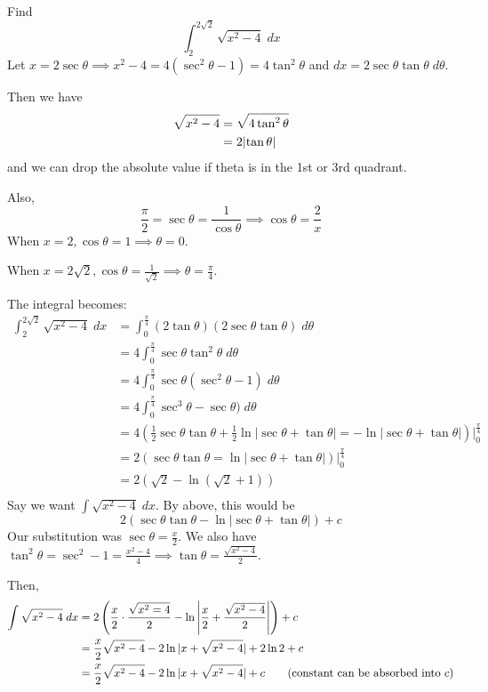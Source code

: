 \documentclass{article}
\begin{document}
  \begin{example}
    Find \[
      \int_{2}^{2\sqrt{2}} \sqrt{x^2 - 4} \; dx
    \]
    Let $x = 2\sec \theta \implies x^2 - 4 = 4(\sec^2 \theta - 1) = 4\tan^2 \theta$ and $dx = 2\sec\theta\tan\theta \; d\theta$.

    Then we have
    \begin{align*}
      \sqrt{x^2 - 4} &= \sqrt{4\tan^2\theta}\\
      &= 2\abs{\tan \theta}\\
    \end{align*} and we can drop the absolute value if theta is in the 1st or 3rd quadrant.

    Also, \[
      \frac{\pi}{2} = \sec \theta = \frac{1}{\cos \theta} \implies \cos \theta = \frac{2}{x}
    \]
    When $x = 2, \cos \theta = 1 \implies \theta = 0$.

    When $x = 2\sqrt{2}, \cos \theta = \frac{1}{\sqrt{2}} \implies \theta = \frac{\pi}{4}$.

    The integral becomes:
    \begin{align*}
      \int_{2}^{2\sqrt{2}} \sqrt{x^2 - 4} \; dx &= \int_0^{\frac{\pi}{4}} (2\tan\theta)(2\sec\theta\tan\theta) \; d\theta\\
      &= 4\int_0^{\frac{\pi}{4}} \sec \theta \tan^2\theta \; d\theta\\
      &= 4\int_0^{\frac{\pi}{4}} \sec\theta(\sec^2\theta - 1)\; d\theta\\
    &= 4\int_0^{\frac{\pi}{4}} \sec^3\theta - \sec\theta)\; d\theta\\\
    &= 4(\frac{1}{2}\sec\theta\tan\theta + \frac{1}{2}\ln |\sec\theta+\tan\theta| =- \ln |\sec\theta+\tan\theta|)\Big|_0^{\frac{\pi}{4}}\\
    &= 2(\sec\theta\tan\theta = \ln|\sec\theta + \tan\theta|)\Big|_0^{\frac{\pi}{4}}\\
    &= 2(\sqrt{2} - \ln(\sqrt{2}+1))\\
  \end{align*}
  Say we want $\int\sqrt{x^2 - 4} \; dx$. By above, this would be \[
    2(\sec\theta\tan\theta - \ln|\sec\theta + \tan\theta|) + c
  \]
  Our substitution was $\sec \theta = \frac{x}{2}$. We also have $\tan^2 \theta = \sec^2 - 1 = \frac{x^2-4}{4} \implies \tan \theta = \frac{\sqrt{x^2-4}}{2}$.

  Then,
  \begin{align*}
    \int \sqrt{x^2-4}\; dx &= 2\left(\frac{x}{2} \cdot \frac{\sqrt{x^2 = 4}}{2} - \ln \abs{\frac{x}{2} + \frac{\sqrt{x^2 - 4}}{2}}\right) + c\\
    &= \frac{x}{2}\sqrt{x^2-4} - 2\ln |x + \sqrt{x^2 - 4}| + 2\ln 2 + c\\
    &= \frac{x}{2}\sqrt{x^2-4} - 2\ln |x + \sqrt{x^2 - 4}| + c \tag{constant can be absorbed into $c$}\\
  \end{align*}
\end{example}
\end{document}
